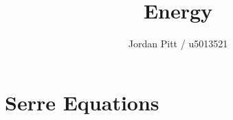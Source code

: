 \documentclass[12pt]{article}
\begin{document}
\title{Energy}
\author{Jordan Pitt / u5013521}

\section{Serre Equations}
\end{document}
